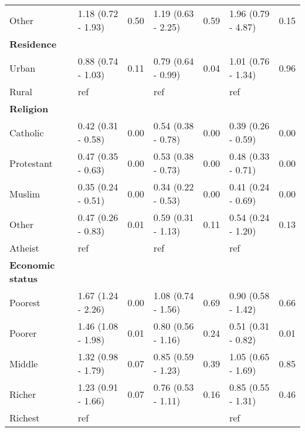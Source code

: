 \documentclass[sn-basic,Numbered,pdflatex]{sn-jnl}
\theoremstyle{remark}
\theoremstyle{definition}
\begin{document}
\begin{table}[!h]
\begin{tabular}[t]{lllllll}
\hspace{1em}Other & 1.18 (0.72 - 1.93) & 0.50 & 1.19 (0.63 - 2.25) & 0.59 & 1.96 (0.79 - 4.87) & 0.15\\
\textbf{Residence} & \textbf{} & \textbf{} & \textbf{} & \textbf{} & \textbf{} & \textbf{}\\
\hspace{1em}Urban & 0.88 (0.74 - 1.03) & 0.11 & 0.79 (0.64 - 0.99) & 0.04 & 1.01 (0.76 - 1.34) & 0.96\\
\hspace{1em}Rural & ref &  & ref &  & ref & \\
\addlinespace
\textbf{Religion} & \textbf{} & \textbf{} & \textbf{} & \textbf{} & \textbf{} & \textbf{}\\
\hspace{1em}Catholic & 0.42 (0.31 - 0.58) & 0.00 & 0.54 (0.38 - 0.78) & 0.00 & 0.39 (0.26 - 0.59) & 0.00\\
\hspace{1em}Protestant & 0.47 (0.35 - 0.63) & 0.00 & 0.53 (0.38 - 0.73) & 0.00 & 0.48 (0.33 - 0.71) & 0.00\\
\hspace{1em}Muslim & 0.35 (0.24 - 0.51) & 0.00 & 0.34 (0.22 - 0.53) & 0.00 & 0.41 (0.24 - 0.69) & 0.00\\
\hspace{1em}Other & 0.47 (0.26 - 0.83) & 0.01 & 0.59 (0.31 - 1.13) & 0.11 & 0.54 (0.24 - 1.20) & 0.13\\
\addlinespace
\hspace{1em}Atheist & ref &  & ref &  & ref & \\
\textbf{Economic status} & \textbf{} & \textbf{} & \textbf{} & \textbf{} & \textbf{} & \textbf{}\\
\hspace{1em}Poorest & 1.67 (1.24 - 2.26) & 0.00 & 1.08 (0.74 - 1.56) & 0.69 & 0.90 (0.58 - 1.42) & 0.66\\
\hspace{1em}Poorer & 1.46 (1.08 - 1.98) & 0.01 & 0.80 (0.56 - 1.16) & 0.24 & 0.51 (0.31 - 0.82) & 0.01\\
\hspace{1em}Middle & 1.32 (0.98 - 1.79) & 0.07 & 0.85 (0.59 - 1.23) & 0.39 & 1.05 (0.65 - 1.69) & 0.85\\
\addlinespace
\hspace{1em}Richer & 1.23 (0.91 - 1.66) & 0.07 & 0.76 (0.53 - 1.11) & 0.16 & 0.85 (0.55 - 1.31) & 0.46\\
\hspace{1em}Richest & ref &  &  &  & ref & \\

\end{tabular}
\end{table}
\end{document}
